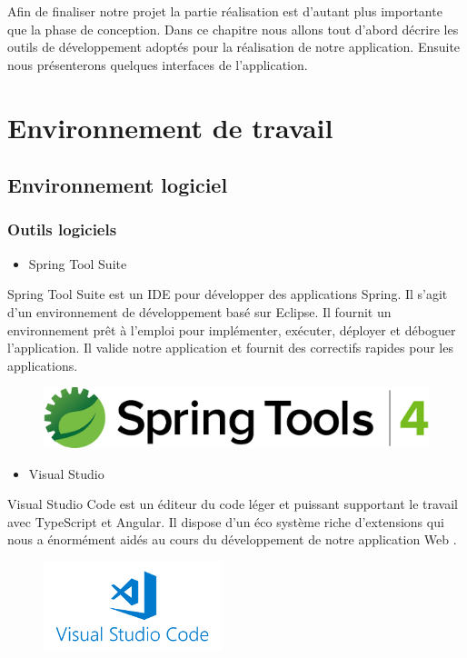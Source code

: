 \hspace{4mm}Afin de finaliser notre projet la partie réalisation est d'autant plus importante que la phase de conception. Dans ce chapitre nous allons tout d'abord décrire les outils de développement adoptés pour la réalisation de notre application. Ensuite nous présenterons quelques interfaces de l'application.
\section{	Environnement de travail}
\subsection{	Environnement logiciel }
\subsubsection{	Outils logiciels}
\begin{itemize}
    \item 	Spring Tool Suite 
\end{itemize}
\par Spring Tool Suite est un IDE pour développer des applications Spring. Il s'agit d'un environnement de développement basé sur Eclipse. Il fournit un environnement prêt à l'emploi pour implémenter, exécuter, déployer et déboguer l'application. Il valide notre application et fournit des correctifs rapides pour les applications. \cite{5}
\newline
\begin{figure}[h]
    \centering
    \includegraphics[scale=0.5]{figures/3333anis5.png}
    \caption*{}
    \label{fig:logo_STS}
\end{figure}\newpage
\begin{itemize}
    \item 	Visual Studio
\end{itemize}
\par Visual Studio Code est un éditeur du code léger et puissant supportant le travail avec TypeScript et Angular. Il dispose d’un éco système riche d’extensions qui nous a énormément aidés au cours du développement de notre application Web \cite{6}.
\begin{figure}[h]
    \centering
    \includegraphics{figures/33anis6.png}
    \caption*{}
    \label{fig:logo_VS}
\end{figure}
